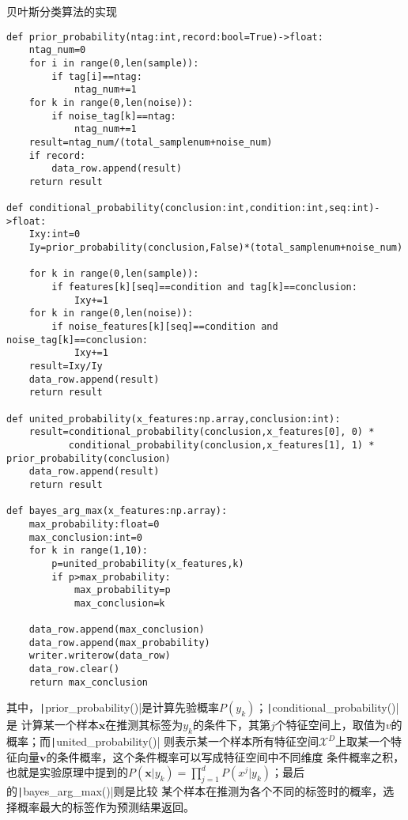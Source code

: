 \documentclass{article}
\begin{document}
\noindent 贝叶斯分类算法的实现
\begin{verbatim}
def prior_probability(ntag:int,record:bool=True)->float:
    ntag_num=0
    for i in range(0,len(sample)):
        if tag[i]==ntag:
            ntag_num+=1
    for k in range(0,len(noise)):
        if noise_tag[k]==ntag:
            ntag_num+=1
    result=ntag_num/(total_samplenum+noise_num)
    if record:
        data_row.append(result)
    return result

def conditional_probability(conclusion:int,condition:int,seq:int)->float:
    Ixy:int=0
    Iy=prior_probability(conclusion,False)*(total_samplenum+noise_num)

    for k in range(0,len(sample)):
        if features[k][seq]==condition and tag[k]==conclusion:
            Ixy+=1
    for k in range(0,len(noise)):
        if noise_features[k][seq]==condition and noise_tag[k]==conclusion:
            Ixy+=1
    result=Ixy/Iy
    data_row.append(result)
    return result

def united_probability(x_features:np.array,conclusion:int):
    result=conditional_probability(conclusion,x_features[0], 0) * 
           conditional_probability(conclusion,x_features[1], 1) * prior_probability(conclusion)
    data_row.append(result)
    return result

def bayes_arg_max(x_features:np.array):
    max_probability:float=0
    max_conclusion:int=0
    for k in range(1,10):
        p=united_probability(x_features,k)
        if p>max_probability:
            max_probability=p
            max_conclusion=k

    data_row.append(max_conclusion)
    data_row.append(max_probability)
    writer.writerow(data_row)
    data_row.clear()
    return max_conclusion
\end{verbatim}
其中，\texttt|prior_probability()|是计算先验概率$P(y_k)$；\texttt|conditional_probability()|是
计算某一个样本$\boldsymbol{x}$在推测其标签为$y_k$的条件下，其第$j$个特征空间上，取值为$v$的概率；而\texttt|united_probability()|
则表示某一个样本所有特征空间$\mathcal{X}^D$上取某一个特征向量$\boldsymbol{v}$的条件概率，这个条件概率可以写成特征空间中不同维度
条件概率之积，也就是实验原理中提到的$P(\boldsymbol{x}|y_k)=\prod_{j=1}^d P(x^j|y_k)$；最后的\texttt|bayes_arg_max()|则是比较
某个样本在推测为各个不同的标签时的概率，选择概率最大的标签作为预测结果返回。
\end{document}
